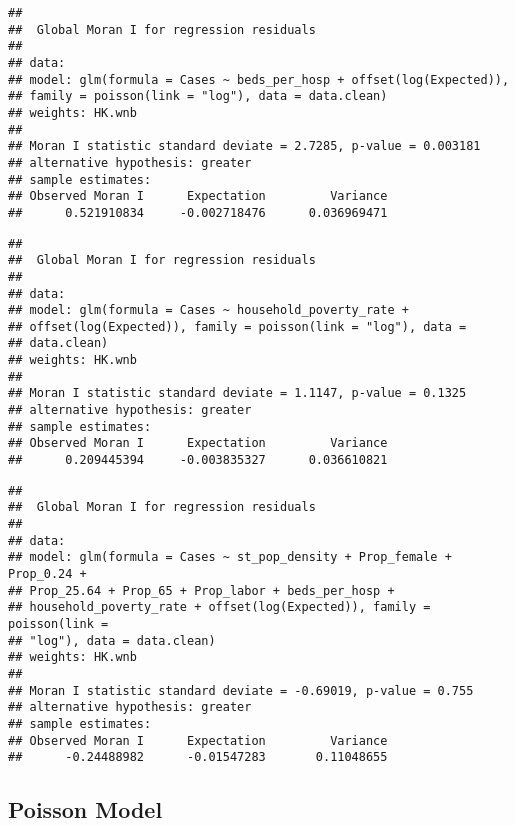 \documentclass[]{article}
\begin{document}
\begin{verbatim}
## 
##  Global Moran I for regression residuals
## 
## data:  
## model: glm(formula = Cases ~ beds_per_hosp + offset(log(Expected)),
## family = poisson(link = "log"), data = data.clean)
## weights: HK.wnb
## 
## Moran I statistic standard deviate = 2.7285, p-value = 0.003181
## alternative hypothesis: greater
## sample estimates:
## Observed Moran I      Expectation         Variance 
##      0.521910834     -0.002718476      0.036969471
\end{verbatim}

\begin{verbatim}
## 
##  Global Moran I for regression residuals
## 
## data:  
## model: glm(formula = Cases ~ household_poverty_rate +
## offset(log(Expected)), family = poisson(link = "log"), data =
## data.clean)
## weights: HK.wnb
## 
## Moran I statistic standard deviate = 1.1147, p-value = 0.1325
## alternative hypothesis: greater
## sample estimates:
## Observed Moran I      Expectation         Variance 
##      0.209445394     -0.003835327      0.036610821
\end{verbatim}

\begin{verbatim}
## 
##  Global Moran I for regression residuals
## 
## data:  
## model: glm(formula = Cases ~ st_pop_density + Prop_female + Prop_0.24 +
## Prop_25.64 + Prop_65 + Prop_labor + beds_per_hosp +
## household_poverty_rate + offset(log(Expected)), family = poisson(link =
## "log"), data = data.clean)
## weights: HK.wnb
## 
## Moran I statistic standard deviate = -0.69019, p-value = 0.755
## alternative hypothesis: greater
## sample estimates:
## Observed Moran I      Expectation         Variance 
##      -0.24488982      -0.01547283       0.11048655
\end{verbatim}

\hypertarget{poisson-model}{%
\subsection{Poisson Model}\label{poisson-model}}
\end{document}

